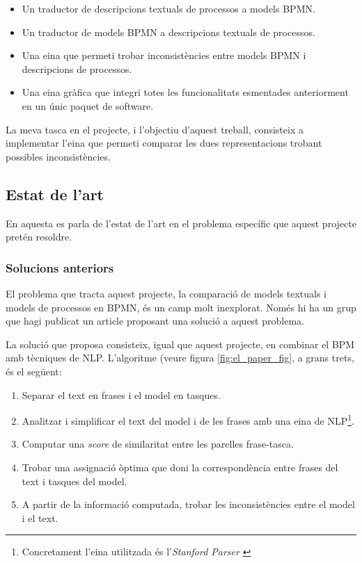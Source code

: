 \documentclass[10pt,a4paper]{article}
\begin{document}
\begin{itemize}
    \item Un traductor de descripcions textuals de processos a models BPMN.
    \item Un traductor de models BPMN a descripcions textuals de processos.
    \item Una eina que permeti trobar inconsistències entre models BPMN i descripcions de processos.
    \item Una eina gràfica que integri totes les funcionalitats esmentades anteriorment en un únic paquet de software.
\end{itemize}

La meva tasca en el projecte, i l'objectiu d'aquest treball, consisteix a implementar l'eina que permeti comparar les dues representacions trobant possibles inconsistències.


\subsection{Estat de l'art}

En aquesta es parla de l'estat de l'art en el problema específic que aquest projecte pretén resoldre. 

\subsubsection{Solucions anteriors}

El problema que tracta aquest projecte, la comparació de models textuals i models de processos en BPMN, és un camp molt inexplorat. Només hi ha un grup \cite{el_paper} que hagi publicat un article proposant una solució a aquest problema. 

La solució que proposa \cite{el_paper} consisteix, igual que aquest projecte, en combinar el BPM amb tècniques de NLP. L'algoritme (veure figura \ref{fig:el_paper_fig}, a grans trets, és el següent:

\begin{enumerate}
    \item Separar el text en frases i el model en tasques.
    \item Analitzar i simplificar el text del model i de les frases amb una eina de NLP\footnote{Concretament l'eina utilitzada és l'\emph{Stanford Parser} \cite{stanford_parser}}.
    \item Computar una \emph{score} de similaritat entre les parelles frase-tasca.
    \item Trobar una assignació òptima que doni la correspondència entre frases del text i tasques del model.
    \item A partir de la informació computada, trobar les inconsistències entre el model i el text.
\end{enumerate}
\end{document}
